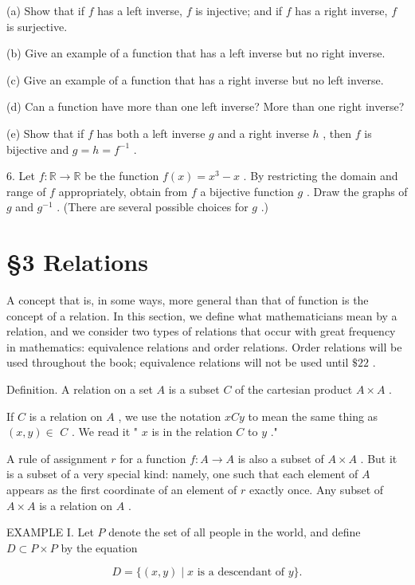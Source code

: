 (a) Show that if \(f\) has a left inverse, \(f\) is injective; and if \(f\) has a right inverse, \(f\) is surjective.

(b) Give an example of a function that has a left inverse but no right inverse.

(c) Give an example of a function that has a right inverse but no left inverse.

(d) Can a function have more than one left inverse? More than one right inverse?

(e) Show that if \(f\) has both a left inverse \(g\) and a right inverse \(h\) , then \(f\) is bijective and \(g = h = {f}^{-1}\) .

6. Let \(f : \mathbb{R} \rightarrow  \mathbb{R}\) be the function \(f\left( x\right)  = {x}^{3} - x\) . By restricting the domain and range of \(f\) appropriately, obtain from \(f\) a bijective function \(g\) . Draw the graphs of \(g\) and \({g}^{-1}\) . (There are several possible choices for \(g\) .)

\section*{§3 Relations}

A concept that is, in some ways, more general than that of function is the concept of a relation. In this section, we define what mathematicians mean by a relation, and we consider two types of relations that occur with great frequency in mathematics: equivalence relations and order relations. Order relations will be used throughout the book; equivalence relations will not be used until \(\$ {22}\) .

Definition. A relation on a set \(A\) is a subset \(C\) of the cartesian product \(A \times  A\) .

If \(C\) is a relation on \(A\) , we use the notation \({xCy}\) to mean the same thing as \(\left( {x,y}\right)  \in\)  \(C\) . We read it " \(x\) is in the relation \(C\) to \(y\) ."

A rule of assignment \(r\) for a function \(f : A \rightarrow  A\) is also a subset of \(A \times  A\) . But it is a subset of a very special kind: namely, one such that each element of \(A\) appears as the first coordinate of an element of \(r\) exactly once. Any subset of \(A \times  A\) is a relation on \(A\) .

EXAMPLE I. Let \(P\) denote the set of all people in the world, and define \(D \subset  P \times  P\) by the equation

\[
D = \{ \left( {x,y}\right)  \mid  x\text{ is a descendant of }y\} .
\]

